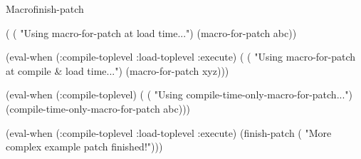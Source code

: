 \documentclass[10pt,twoside,english,pdftex]{article}
\begin{document}
\begin{functiondoc}{Macro}{finish-patch}{\superstar}
\begin{example}
  (
   ( "Using macro-for-patch at load time...")
   (macro-for-patch abc))

  (eval-when (:compile-toplevel :load-toplevel :execute)
    (
     ( "Using macro-for-patch at compile & load time...")
     (macro-for-patch xyz)))\goodpagebreak

  (eval-when (:compile-toplevel)
    (
     ( "Using compile-time-only-macro-for-patch...")
     (compile-time-only-macro-for-patch abc)))

  (eval-when (:compile-toplevel :load-toplevel :execute)
    (finish-patch
     ( "More complex example patch finished!")))
\end{example}

\end{functiondoc}

\end{document}
